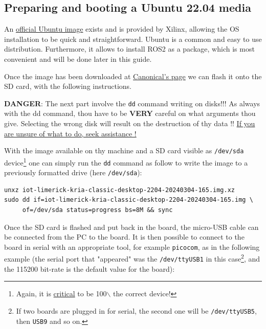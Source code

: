 \documentclass[10pt]{article}
\begin{document}
\subsection{Preparing and booting a Ubuntu 22.04 media}
\label{sec:org951b541}
An \href{https://ubuntu.com/download/amd-xilinx}{official Ubuntu image} exists and is
provided by Xilinx, allowing the OS installation to be quick and
straightforward.
Ubuntu is a common and easy to use distribution. Furthermore,
it allows to install ROS2 as a package, which is most convenient and will be
done later in this guide.

Once the image has been downloaded at \href{https://ubuntu.com/download/amd-xilinx}{Canonical's page}
we can flash it onto the SD card, with the following instructions.

\begin{tcolorbox}[colback=red!5!white,colframe=red!75!black]
\textbf{DANGER}: The next part involve the \texttt{dd} command writing on disks!!!
As always with the dd command, thou have to be \textbf{VERY} careful on what arguments
thou give. Selecting the wrong disk will result on the destruction of
thy data !!
\uline{If you are unsure of what to do, seek assistance !}
\end{tcolorbox}

With the image available on thy machine and a SD card visible as \texttt{/dev/sda} device\footnote{Again, it is \uline{critical} to be 100$\backslash$%
the correct device!}
one can simply run the \texttt{dd} command as follow to write the image to a previously formatted drive (here \texttt{/dev/sda}):

\begin{verbatim}
unxz iot-limerick-kria-classic-desktop-2204-20240304-165.img.xz
sudo dd if=iot-limerick-kria-classic-desktop-2204-20240304-165.img \
     of=/dev/sda status=progress bs=8M && sync
\end{verbatim}


Once the SD card is flashed and put back in the board, the micro-USB cable can be
connected from the PC to the board. It is then possible to
connect to the board in serial with an appropriate tool, for example \texttt{picocom},
as in the following example (the serial port that "appeared" was the \texttt{/dev/ttyUSB1} in this case\footnote{If two boards are plugged in for serial, the second one will be \texttt{/dev/ttyUSB5}, then \texttt{USB9} and so on.},
and the 115200 bit-rate is the default value for the board):
\end{document}
